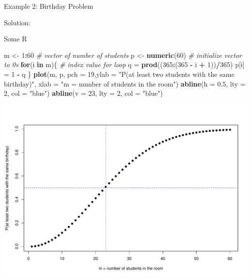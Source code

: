 \documentclass[
  ignorenonframetext,
]{beamer}
\newenvironment{Shaded}{\begin{snugshade}}{\end{snugshade}}
\newcommand{\AttributeTok}[1]{\textcolor[rgb]{0.13,0.29,0.53}{#1}}
\newcommand{\CommentTok}[1]{\textcolor[rgb]{0.56,0.35,0.01}{\textit{#1}}}
\newcommand{\ControlFlowTok}[1]{\textcolor[rgb]{0.13,0.29,0.53}{\textbf{#1}}}
\newcommand{\DecValTok}[1]{\textcolor[rgb]{0.00,0.00,0.81}{#1}}
\newcommand{\FloatTok}[1]{\textcolor[rgb]{0.00,0.00,0.81}{#1}}
\newcommand{\FunctionTok}[1]{\textcolor[rgb]{0.13,0.29,0.53}{\textbf{#1}}}
\newcommand{\NormalTok}[1]{#1}
\newcommand{\OtherTok}[1]{\textcolor[rgb]{0.56,0.35,0.01}{#1}}
\newcommand{\SpecialCharTok}[1]{\textcolor[rgb]{0.81,0.36,0.00}{\textbf{#1}}}
\newcommand{\StringTok}[1]{\textcolor[rgb]{0.31,0.60,0.02}{#1}}
\begin{document}
\begin{frame}{Example 2: Birthday Problem}
\protect\hypertarget{example-2-birthday-problem-1}{}
\begin{tcolorbox}
Solution: 

\vspace{65mm}

\end{tcolorbox}
\end{frame}

\begin{frame}[fragile]{Some R}
\protect\hypertarget{some-r}{}
\scriptsize

\begin{Shaded}
\begin{Highlighting}[]
\NormalTok{m }\OtherTok{\textless{}{-}} \DecValTok{1}\SpecialCharTok{:}\DecValTok{60}             \CommentTok{\# vector of number of students}
\NormalTok{p }\OtherTok{\textless{}{-}} \FunctionTok{numeric}\NormalTok{(}\DecValTok{60}\NormalTok{)      }\CommentTok{\# initialize vector to 0\textquotesingle{}s}
\ControlFlowTok{for}\NormalTok{(i }\ControlFlowTok{in}\NormalTok{ m)\{          }\CommentTok{\# index value for loop}
\NormalTok{ q }\OtherTok{=} \FunctionTok{prod}\NormalTok{((}\DecValTok{365}\SpecialCharTok{:}\NormalTok{(}\DecValTok{365} \SpecialCharTok{{-}}\NormalTok{ i }\SpecialCharTok{+} \DecValTok{1}\NormalTok{))}\SpecialCharTok{/}\DecValTok{365}\NormalTok{)}
\NormalTok{ p[i] }\OtherTok{=} \DecValTok{1} \SpecialCharTok{{-}}\NormalTok{ q}
\NormalTok{\}}
\FunctionTok{plot}\NormalTok{(m, p, }\AttributeTok{pch =} \DecValTok{19}\NormalTok{,}\AttributeTok{ylab =} \StringTok{"P(at least two students with the same birthday)"}\NormalTok{,}
     \AttributeTok{xlab =} \StringTok{"m = number of students in the room"}\NormalTok{)}
\FunctionTok{abline}\NormalTok{(}\AttributeTok{h =} \FloatTok{0.5}\NormalTok{, }\AttributeTok{lty =} \DecValTok{2}\NormalTok{, }\AttributeTok{col =} \StringTok{"blue"}\NormalTok{)}
\FunctionTok{abline}\NormalTok{(}\AttributeTok{v =} \DecValTok{23}\NormalTok{, }\AttributeTok{lty =} \DecValTok{2}\NormalTok{, }\AttributeTok{col =} \StringTok{"blue"}\NormalTok{)}
\end{Highlighting}
\end{Shaded}

\begin{center}\includegraphics[width=0.3\linewidth,height=0.5\textheight]{Week7_Lect_files/figure-beamer/unnamed-chunk-1-1} \end{center}
\normalsize
\end{frame}
\end{document}
